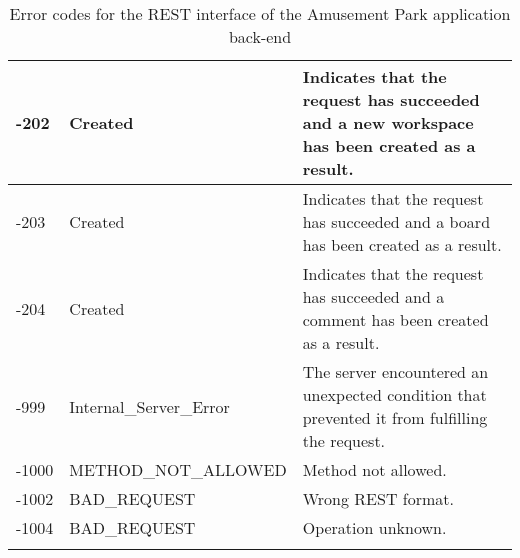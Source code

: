 \begin{longtable}{|p{}|p{} |p{}|}
-202  & Created                  & Indicates that the request has succeeded and a new workspace has been created as a result. \\ \hline
-203  & Created                  & Indicates that the request has succeeded and a board has been created as a result. \\ \hline
-204  & Created                  & Indicates that the request has succeeded and a comment has been created as a result. \\ \hline
-999  & Internal\_Server\_Error  & The server encountered an unexpected condition that prevented it from fulfilling the request. \\ \hline
-1000 & METHOD\_NOT\_ALLOWED     & Method not allowed. \\ \hline
-1002 & BAD\_REQUEST             & Wrong REST format. \\ \hline
-1004 & BAD\_REQUEST             & Operation unknown. \\ \hline

\caption{Error codes for the REST interface of the Amusement Park application back-end}
\label{tab:termGlossary}
\end{longtable}